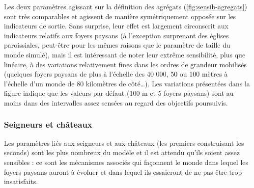 Les deux paramètres agissant sur la définition des agrégats (\cref{fig:sensib-agregats}) sont très comparables et agissent de manière symétriquement opposée sur les indicateurs de sortie.
Sans surprise, leur effet est largement circonscrit aux indicateurs relatifs aux foyers paysans (à l'exception surprenant des églises paroissiales, peut-être pour les mêmes raisons que le paramètre de taille du monde simulé), mais il est intéressant de noter leur extrême sensibilité, plus que linéaire, à des variations relativement fines dans les ordres de grandeur mobilisés (quelques foyers paysans de plus à l'échelle des 40 000, 50 ou 100 mètres à l'échelle d'un monde de 80 kilomètres de côté\ldots).
Les variations présentées dans la figure indique que les valeurs par défaut (100 m et 5 foyers paysans) sont au moins dans des intervalles assez sensées au regard des objectifs poursuivis.

\subsubsection{Seigneurs et châteaux}

Les paramètres liés aux seigneurs et aux châteaux (les premiers construisant les seconds) sont les plus nombreux du modèle et il est attendu qu'ils soient assez sensibles : ce sont les mécanismes associés qui façonnent le monde dans lequel les foyers paysans auront à évoluer et dans lequel ils essaieront de ne pas être trop insatisfaits.

